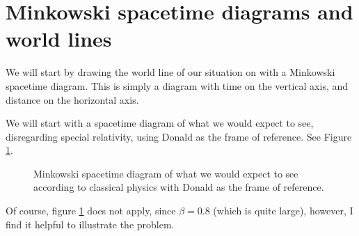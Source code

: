 \section{Minkowski spacetime diagrams and world lines}
	We will start by drawing the world line of our situation on with a Minkowski spacetime diagram.
	This is simply a diagram with time on the vertical axis, and distance on the horizontal axis.

	We will start with a spacetime diagram of what we would expect to see, disregarding special relativity, using Donald as the frame of reference. See Figure \ref{fig:classicalMinkowski}.
	\begin{figure}[H]
		\centering
		\caption{Minkowski spacetime diagram of what we would expect to see according to classical physics with Donald as the frame of reference.}
		\label{fig:classicalMinkowski}
	\end{figure}
	Of course, figure \ref{fig:classicalMinkowski} does not apply, since $\beta = 0.8$ (which is quite large), however, I find it helpful to illustrate the problem.
